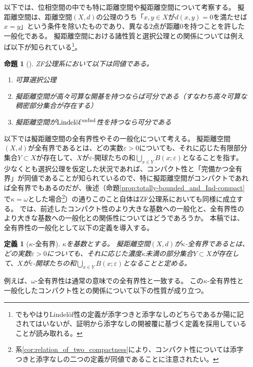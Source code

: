 \documentclass{jarticle}
\newtheorem{proposition}{命題}
\newtheorem{definition}{定義}
\newcommand{\WithoutIndex}[1]{$\textrm{#1}{}^{\,\textrm{\scriptsize unInd}}$}
\begin{document}
以下では、位相空間の中でも特に距離空間や擬距離空間について考察する。
擬距離空間は、距離空間$(X,d)$の公理のうち「$x,y \in X$が$d(x,y) = 0$を満たせば$x = y$」という条件を除いたものであり、異なる$2$点が距離$0$を持つことを許した一般化である。
擬距離空間における諸性質と選択公理との関係については例えば以下が知られている\footnote{\cite{BH98}でもやはりLindel\"{o}f性の定義が添字つきと添字なしのどちらであるか陽に記されてはいないが、証明から添字なしの開被覆に基づく定義を採用していることが読み取れる。}。

\begin{proposition}
[{\cite{BH98}}]
\label{prop:equivalence_from_BH98}
ZF公理系において以下は同値である。
\begin{enumerate}
\item
可算選択公理
\item
擬距離空間が高々可算な開基を持つならば可分である（すなわち高々可算な稠密部分集合が存在する）
\item
擬距離空間が\WithoutIndex{Lindel\"{o}f}性を持つなら可分である
\end{enumerate}
\end{proposition}

以下では擬距離空間の全有界性やその一般化について考える。
擬距離空間$(X,d)$が全有界であるとは、どの実数$\varepsilon > 0$についても、それに応じた有限部分集合$Y \subset X$が存在して、$X$が$\varepsilon$-開球たちの和$\bigcup_{x \in Y} B(x;\varepsilon)$となることを指す。
少なくとも選択公理を仮定した状況であれば、コンパクト性と「完備かつ全有界」が同値であることが知られているので、特に擬距離空間がコンパクトであれば全有界でもあるのだが、後述（命題\ref{prop:totally-bounded_and_Ind-compact}で$\kappa = \omega$とした場合\footnote{系\ref{cor:relation_of_two_compactness}により、コンパクト性については添字つきと添字なしの二つの定義が同値であることに注意されたい。}）の通りこのこと自体はZF公理系においても同様に成立する。
では、前述したコンパクト性のより大きな基数への一般化と、全有界性のより大きな基数への一般化との関係性についてはどうであろうか。
本稿では、全有界性の一般化として以下の定義を導入する。
\begin{definition}
[$\kappa$-全有界]
$\kappa$を基数とする。
擬距離空間$(X,d)$が$\kappa$-全有界であるとは、どの実数$\varepsilon > 0$についても、それに応じた濃度$\kappa$未満の部分集合$Y \subset X$が存在して、$X$が$\varepsilon$-開球たちの和$\bigcup_{x \in Y} B(x;\varepsilon)$となることと定める。
\end{definition}

例えば、$\omega$-全有界性は通常の意味での全有界性と一致する。
この$\kappa$-全有界性と一般化したコンパクト性との関係について以下の性質が成り立つ。
\end{document}
